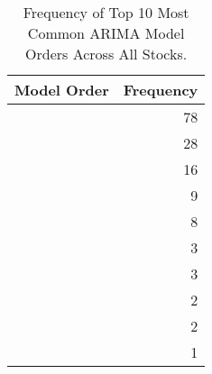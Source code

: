 \begin{table}
\caption{Frequency of Top 10 Most Common ARIMA Model Orders Across All Stocks.}
\label{tab:arima_orders}
\begin{tabular}{lr}
\toprule
Model Order & Frequency \\
\midrule
[0 0 0] & 78 \\
[0 0 1] & 28 \\
[1 0 0] & 16 \\
[0 0 2] & 9 \\
[2 0 0] & 8 \\
[1 0 1] & 3 \\
[0 0 3] & 3 \\
[3 0 0] & 2 \\
[1 0 3] & 2 \\
[3 0 2] & 1 \\
\bottomrule
\end{tabular}
\end{table}
